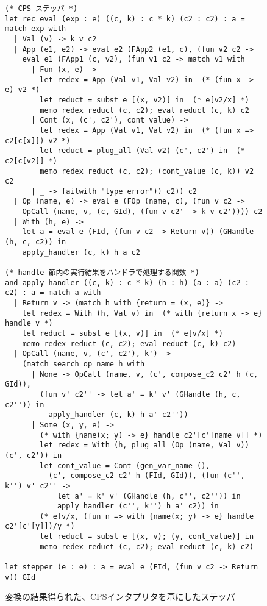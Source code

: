 \begin{figure}
\begin{spacing}{0.9} 
\begin{verbatim}
(* CPS ステッパ *)
let rec eval (exp : e) ((c, k) : c * k) (c2 : c2) : a = match exp with
  | Val (v) -> k v c2
  | App (e1, e2) -> eval e2 (FApp2 (e1, c), (fun v2 c2 ->
    eval e1 (FApp1 (c, v2), (fun v1 c2 -> match v1 with
      | Fun (x, e) ->
        let redex = App (Val v1, Val v2) in  (* (fun x -> e) v2 *)
        let reduct = subst e [(x, v2)] in  (* e[v2/x] *)
        memo redex reduct (c, c2); eval reduct (c, k) c2
      | Cont (x, (c', c2'), cont_value) ->
        let redex = App (Val v1, Val v2) in  (* (fun x => c2[c[x]]) v2 *)
        let reduct = plug_all (Val v2) (c', c2') in  (* c2[c[v2]] *)
        memo redex reduct (c, c2); (cont_value (c, k)) v2 c2
      | _ -> failwith "type error")) c2)) c2
  | Op (name, e) -> eval e (FOp (name, c), (fun v c2 ->
    OpCall (name, v, (c, GId), (fun v c2' -> k v c2')))) c2
  | With (h, e) ->
    let a = eval e (FId, (fun v c2 -> Return v)) (GHandle (h, c, c2)) in
    apply_handler (c, k) h a c2

(* handle 節内の実行結果をハンドラで処理する関数 *)
and apply_handler ((c, k) : c * k) (h : h) (a : a) (c2 : c2) : a = match a with
  | Return v -> (match h with {return = (x, e)} ->
    let redex = With (h, Val v) in  (* with {return x -> e} handle v *)
    let reduct = subst e [(x, v)] in  (* e[v/x] *)
    memo redex reduct (c, c2); eval reduct (c, k) c2)
  | OpCall (name, v, (c', c2'), k') ->
    (match search_op name h with
      | None -> OpCall (name, v, (c', compose_c2 c2' h (c, GId)),
        (fun v' c2'' -> let a' = k' v' (GHandle (h, c, c2'')) in
          apply_handler (c, k) h a' c2''))
      | Some (x, y, e) ->
        (* with {name(x; y) -> e} handle c2'[c'[name v]] *)
        let redex = With (h, plug_all (Op (name, Val v)) (c', c2')) in
        let cont_value = Cont (gen_var_name (),
          (c', compose_c2 c2' h (FId, GId)), (fun (c'', k'') v' c2'' ->
            let a' = k' v' (GHandle (h, c'', c2'')) in
            apply_handler (c'', k'') h a' c2)) in
        (* e[v/x, (fun n => with {name(x; y) -> e} handle c2'[c'[y]])/y *)
        let reduct = subst e [(x, v); (y, cont_value)] in
        memo redex reduct (c, c2); eval reduct (c, k) c2)

let stepper (e : e) : a = eval e (FId, (fun v c2 -> Return v)) GId
\end{verbatim}
\caption{変換の結果得られた、CPSインタプリタを基にしたステッパ}
\label{figure:6cps}
\end{spacing}
\end{figure}

